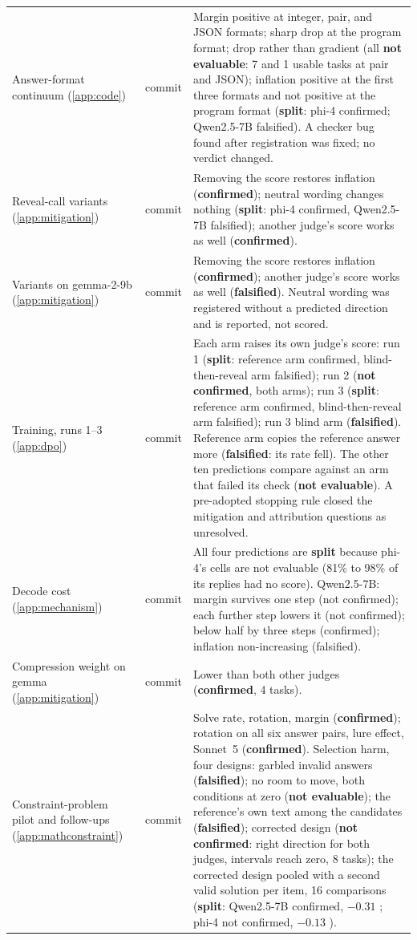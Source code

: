 {\begin{longtable}{L{3.2cm}L{1.1cm}L{8.7cm}}
Answer-format continuum (\cref{app:code}) & commit & Margin positive at integer, pair, and JSON formats; sharp drop at the program format; drop rather than gradient (all \textbf{not evaluable}: 7 and 1 usable tasks at pair and JSON); inflation positive at the first three formats and not positive at the program format (\textbf{split}: phi-4 confirmed; Qwen2.5-7B falsified). A checker bug found after registration was fixed; no verdict changed. \\
Reveal-call variants (\cref{app:mitigation}) & commit & Removing the score restores inflation (\textbf{confirmed}); neutral wording changes nothing (\textbf{split}: phi-4 confirmed, Qwen2.5-7B falsified); another judge's score works as well (\textbf{confirmed}). \\
Variants on gemma-2-9b (\cref{app:mitigation}) & commit & Removing the score restores inflation (\textbf{confirmed}); another judge's score works as well (\textbf{falsified}). Neutral wording was registered without a predicted direction and is reported, not scored. \\
Training, runs 1--3 (\cref{app:dpo}) & commit & Each arm raises its own judge's score: run 1 (\textbf{split}: reference arm confirmed, blind-then-reveal arm falsified); run 2 (\textbf{not confirmed}, both arms); run 3 (\textbf{split}: reference arm confirmed, blind-then-reveal arm falsified); run 3 blind arm (\textbf{falsified}). Reference arm copies the reference answer more (\textbf{falsified}: its rate fell). The other ten predictions compare against an arm that failed its check (\textbf{not evaluable}). A pre-adopted stopping rule closed the mitigation and attribution questions as unresolved. \\
Decode cost (\cref{app:mechanism}) & commit & All four predictions are \textbf{split} because phi-4's cells are not evaluable (81\% to 98\% of its replies had no score). Qwen2.5-7B: margin survives one step (not confirmed); each further step lowers it (not confirmed); below half by three steps (confirmed); inflation non-increasing (falsified). \\
Compression weight on gemma (\cref{app:mitigation}) & commit & Lower than both other judges (\textbf{confirmed}, 4 tasks). \\
Constraint-problem pilot and follow-ups (\cref{app:mathconstraint}) & commit & Solve rate, rotation, margin (\textbf{confirmed}); rotation on all six answer pairs, lure effect, Sonnet~5 (\textbf{confirmed}). Selection harm, four designs: garbled invalid answers (\textbf{falsified}); no room to move, both conditions at zero (\textbf{not evaluable}); the reference's own text among the candidates (\textbf{falsified}); corrected design (\textbf{not confirmed}: right direction for both judges, intervals reach zero, 8 tasks); the corrected design pooled with a second valid solution per item, 16 comparisons (\textbf{split}: Qwen2.5-7B confirmed, $-0.31$ ; phi-4 not confirmed, $-0.13$ ). \\

\end{longtable}}
